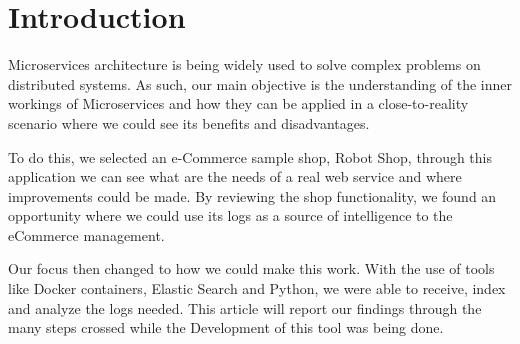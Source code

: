 \section{Introduction}

Microservices architecture is being widely used to solve complex problems on distributed systems. As such, our main objective is the understanding of the inner workings of Microservices and how they can be applied in a close-to-reality scenario where we could see its benefits and disadvantages.

To do this, we selected an e-Commerce sample shop, Robot Shop, through this application we can see what are the needs of a real web service and where improvements could be made. By reviewing the shop functionality, we found an opportunity where we could use its logs as a source of intelligence to the eCommerce management.

Our focus then changed to how we could make this work. With the use of tools like Docker containers, Elastic Search and Python, we were able to receive, index and analyze the logs needed. This article will report our findings through the many steps crossed while the Development of this tool was being done.
